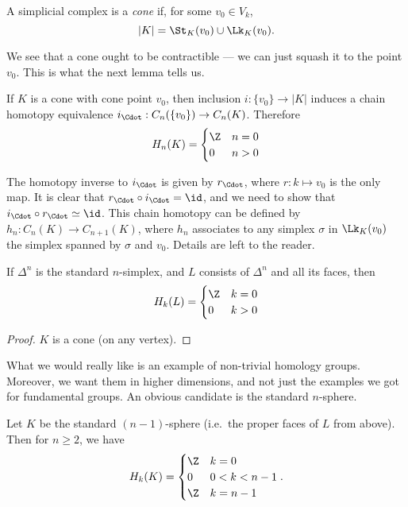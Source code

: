 \documentclass[a4paper]{article}
\begin{document}
\begin{defi}[Cone]
  A simplicial complex is a \emph{cone} if, for some $v_0 \in V_k$,
  \[
    |K| = \St_K(v_0) \cup \Lk_K(v_0).
  \]
\end{defi}
\begin{center}
\end{center}
We see that a cone ought to be contractible --- we can just squash it to the point $v_0$. This is what the next lemma tells us.
\begin{lemma}
  If $K$ is a cone with cone point $v_0$, then inclusion $i: \{v_0\} \to |K|$ induces a chain homotopy equivalence $i_{\Cdot}: C_n (\{v_0\}) \to C_n(K)$. Therefore
  \[
    H_n(K) =
    \begin{cases}
      \Z & n = 0\\
      0 & n > 0
    \end{cases}
  \]
\end{lemma}
The homotopy inverse to $i_{\Cdot}$ is given by $r_{\Cdot}$, where $r: k \mapsto v_0$ is the only map. It is clear that $r_{\Cdot} \circ i_{\Cdot} = \id$, and we need to show that $i_{\Cdot} \circ r_{\Cdot} \simeq \id$. This chain homotopy can be defined by $h_n: C_n(K) \to C_{n + 1}(K)$, where $h_n$ associates to any simplex $\sigma$ in $\Lk_K(v_0)$ the simplex spanned by $\sigma$ and $v_0$. Details are left to the reader.

\begin{cor}
  If $\Delta^n$ is the standard $n$-simplex, and $L$ consists of $\Delta^n$ and all its faces, then
  \[
    H_k(L) =
    \begin{cases}
      \Z & k = 0\\
      0 & k > 0
    \end{cases}
  \]
\end{cor}

\begin{proof}
  $K$ is a cone (on any vertex).
\end{proof}

What we would really like is an example of non-trivial homology groups. Moreover, we want them in higher dimensions, and not just the examples we got for fundamental groups. An obvious candidate is the standard $n$-sphere.
\begin{cor}
  Let $K$ be the standard $(n - 1)$-sphere (i.e.\ the proper faces of $L$ from above). Then for $n \geq 2$, we have
  \[
    H_k(K) =
    \begin{cases}
      \Z & k = 0\\
      0 & 0 < k < n - 1\\
      \Z & k = n - 1
    \end{cases}.
  \]
\end{cor}
\end{document}
